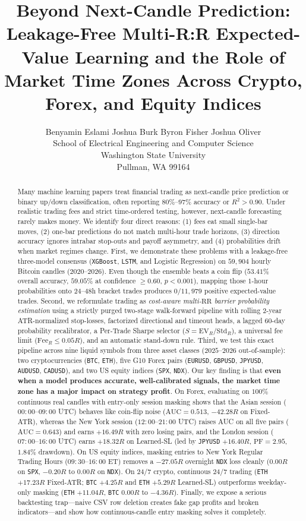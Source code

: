 \documentclass{article}
\title{Beyond Next-Candle Prediction: Leakage-Free Multi-R:R Expected-Value Learning and the Role of Market Time Zones Across Crypto, Forex, and Equity Indices}
\author{
  Benyamin Eslami \hspace{1.5em} Joshua Burk \hspace{1.5em} Byron Fisher \hspace{1.5em} Joshua Oliver \\
  School of Electrical Engineering and Computer Science \\
  Washington State University \\
  Pullman, WA 99164 \\
}
\newcommand{\EVR}{\mathrm{EV}_R}
\newcommand{\FeeR}{\mathrm{Fee}_R}
\newcommand{\StdR}{\mathrm{Std}_R}
\newcommand{\RR}{\mathrm{RR}}
\newcommand{\PF}{\mathrm{PF}}
\begin{document}
\maketitle

\begin{abstract}
Many machine learning papers treat financial trading as next-candle price prediction or binary up/down classification, often reporting $80\%$--$97\%$ accuracy or $R^2 > 0.90$. Under realistic trading fees and strict time-ordered testing, however, next-candle forecasting rarely makes money. We identify four direct reasons: (1) fees eat small single-bar moves, (2) one-bar predictions do not match multi-hour trade horizons, (3) direction accuracy ignores intrabar stop-outs and payoff asymmetry, and (4) probabilities drift when market regimes change. First, we demonstrate these problems with a leakage-free three-model consensus (\texttt{XGBoost}, \texttt{LSTM}, and Logistic Regression) on $59{,}904$ hourly Bitcoin candles ($2020$--$2026$). Even though the ensemble beats a coin flip ($53.41\%$ overall accuracy, $59.05\%$ at confidence $\ge 0.60$, $p < 0.001$), mapping those $1$-hour probabilities onto $24$--$48$h bracket trades produces $0 / 11{,}979$ positive expected-value trades. Second, we reformulate trading as \emph{cost-aware multi-$\RR$ barrier probability estimation} using a strictly purged two-stage walk-forward pipeline with rolling $2$-year ATR-normalized stop-losses, factorized directional and timeout heads, a lagged $60$-day probability recalibrator, a Per-Trade Sharpe selector ($S = \EVR / \StdR$), a universal fee limit ($\FeeR \le 0.05R$), and an automatic stand-down rule. Third, we test this exact pipeline across nine liquid symbols from three asset classes ($2025$--$2026$ out-of-sample): two cryptocurrencies (\texttt{BTC}, \texttt{ETH}), five G10 Forex pairs (\texttt{EURUSD}, \texttt{GBPUSD}, \texttt{JPYUSD}, \texttt{AUDUSD}, \texttt{CADUSD}), and two US equity indices (\texttt{SPX}, \texttt{NDX}). Our key finding is that \textbf{even when a model produces accurate, well-calibrated signals, the market time zone has a major impact on strategy profit}. On Forex, evaluating on $100\%$ continuous real candles with entry-only session masking shows that the Asian session ($00{:}00$--$09{:}00$ UTC) behaves like coin-flip noise ($\mathrm{AUC} = 0.513$, $-42.28R$ on Fixed-ATR), whereas the New York session ($12{:}00$--$21{:}00$ UTC) raises AUC on all five pairs ($\mathrm{AUC} = 0.643$) and earns $+16.49R$ with zero losing pairs, and the London session ($07{:}00$--$16{:}00$ UTC) earns $+18.32R$ on Learned-SL (led by \texttt{JPYUSD} $+16.40R$, $\PF = 2.95$, $1.84\%$ drawdown). On US equity indices, masking entries to New York Regular Trading Hours ($09{:}30$--$16{:}00$ ET) removes a $-27.05R$ overnight \texttt{NDX} loss cleanly ($0.00R$ on \texttt{SPX}, $-0.20R$ to $0.00R$ on \texttt{NDX}). On 24/7 crypto, continuous 24/7 trading (\texttt{ETH} $+17.23R$ Fixed-ATR; \texttt{BTC} $+4.25R$ and \texttt{ETH} $+5.29R$ Learned-SL) outperforms weekday-only masking (\texttt{ETH} $+11.04R$, \texttt{BTC} $0.00R$ to $-4.36R$). Finally, we expose a serious backtesting trap---naive CSV row deletion creates fake gap profits and broken indicators---and show how continuous-candle entry masking solves it completely.

\end{abstract}
\end{document}
